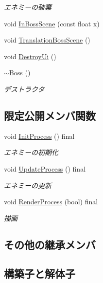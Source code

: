 \begin{DoxyCompactItemize}
\begin{DoxyCompactList}\small\item\em エネミーの破棄 \end{DoxyCompactList}\item 
void \mbox{\hyperlink{class_boss_adb8591a0e2a919380e560f05b51fa171}{In\+Boss\+Scene}} (const float x)
\item 
void \mbox{\hyperlink{class_boss_a2d13fa10c0820f4131c145b6496a5e0b}{Translation\+Boss\+Scene}} ()
\item 
void \mbox{\hyperlink{class_boss_af1d3f76c28bff11d80530e4c8fdca355}{Destroy\+Ui}} ()
\item 
\mbox{\hyperlink{class_boss_ae2300fbed7e29873d66c5a89beb3a628}{$\sim$\+Boss}} ()
\begin{DoxyCompactList}\small\item\em デストラクタ \end{DoxyCompactList}\end{DoxyCompactItemize}
\subsection*{限定公開メンバ関数}
\begin{DoxyCompactItemize}
\item 
void \mbox{\hyperlink{class_boss_a460293079fd93f0ad2b98193fa367aa7}{Init\+Process}} () final
\begin{DoxyCompactList}\small\item\em エネミーの初期化 \end{DoxyCompactList}\item 
void \mbox{\hyperlink{class_boss_a12b3970fee863198d6dafb9bafc55d47}{Update\+Process}} () final
\begin{DoxyCompactList}\small\item\em エネミーの更新 \end{DoxyCompactList}\item 
void \mbox{\hyperlink{class_boss_a6681bd6fc6dc35e200f9e63f196301af}{Render\+Process}} (bool) final
\begin{DoxyCompactList}\small\item\em 描画 \end{DoxyCompactList}\end{DoxyCompactItemize}
\subsection*{その他の継承メンバ}


\subsection{構築子と解体子}
\mbox{\label{class_boss_af287739a9fe8cb9501795656d34f3018}} 
